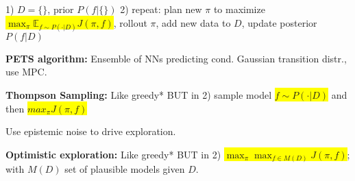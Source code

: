\documentclass[11pt,landscape,a4paper,fleqn]{article}
\newcommand{\mhl}[1]{\setlength{\fboxsep}{0pt}\colorbox{yellow}{#1}}
\begin{document}
\begin{multicols*}{4}
	1) $D=\{\}$, prior $P(f|\{\})$ 2) repeat: plan new $\pi$ to maximize \mhl{$\max_\pi \mathbb{E}_{f \sim P(\cdot | D)} J(\pi, f)$}, rollout $\pi$, add new data to $D$, update posterior $P(f | D)$

	\textbf{PETS algorithm:} Ensemble of NNs predicting cond. Gaussian transition distr., use MPC.

	\textbf{Thompson Sampling:} Like greedy\textcolor{mypink}{*} BUT in 2) sample model \mhl{$f \sim P(\cdot | D)$} and then \mhl{$max_\pi J(\pi, f)$}

	Use epistemic noise to drive exploration.

	\textbf{Optimistic exploration:} Like greedy\textcolor{mypink}{*} BUT in 2) \mhl{$\max_\pi \max_{f \in M(D)} J(\pi, f)$}; with $M(D)$ set of plausible models given $D$.




\end{multicols*}
\end{document}

